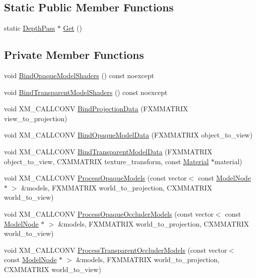 \subsection*{Static Public Member Functions}
\begin{DoxyCompactItemize}
\item 
static \hyperlink{classmage_1_1_depth_pass}{Depth\+Pass} $\ast$ \hyperlink{classmage_1_1_depth_pass_a62a4f1dd404fdb43517d372537ea0e7f}{Get} ()
\end{DoxyCompactItemize}
\subsection*{Private Member Functions}
\begin{DoxyCompactItemize}
\item 
void \hyperlink{classmage_1_1_depth_pass_a6e10b136e64265fa36b9152353946bdc}{Bind\+Opaque\+Model\+Shaders} () const noexcept
\item 
void \hyperlink{classmage_1_1_depth_pass_af7765d2e9d94627671341d5d782b16d2}{Bind\+Transparent\+Model\+Shaders} () const noexcept
\item 
void X\+M\+\_\+\+C\+A\+L\+L\+C\+O\+NV \hyperlink{classmage_1_1_depth_pass_a9fa93bf5d67b9396d358e595be55a075}{Bind\+Projection\+Data} (F\+X\+M\+M\+A\+T\+R\+IX view\+\_\+to\+\_\+projection)
\item 
void X\+M\+\_\+\+C\+A\+L\+L\+C\+O\+NV \hyperlink{classmage_1_1_depth_pass_a674fc5fe2e8cae4c704a554dc8bc1fdd}{Bind\+Opaque\+Model\+Data} (F\+X\+M\+M\+A\+T\+R\+IX object\+\_\+to\+\_\+view)
\item 
void X\+M\+\_\+\+C\+A\+L\+L\+C\+O\+NV \hyperlink{classmage_1_1_depth_pass_a37236eb83793b4f11f1f4f2ed86f60e2}{Bind\+Transparent\+Model\+Data} (F\+X\+M\+M\+A\+T\+R\+IX object\+\_\+to\+\_\+view, C\+X\+M\+M\+A\+T\+R\+IX texture\+\_\+transform, const \hyperlink{classmage_1_1_material}{Material} $\ast$material)
\item 
void X\+M\+\_\+\+C\+A\+L\+L\+C\+O\+NV \hyperlink{classmage_1_1_depth_pass_a2aabb8bd4676a8ce633e5cb91e6b13d9}{Process\+Opaque\+Models} (const vector$<$ const \hyperlink{classmage_1_1_model_node}{Model\+Node} $\ast$ $>$ \&models, F\+X\+M\+M\+A\+T\+R\+IX world\+\_\+to\+\_\+projection, C\+X\+M\+M\+A\+T\+R\+IX world\+\_\+to\+\_\+view)
\item 
void X\+M\+\_\+\+C\+A\+L\+L\+C\+O\+NV \hyperlink{classmage_1_1_depth_pass_acfbb86af8b6a106fe202a6999df9d744}{Process\+Opaque\+Occluder\+Models} (const vector$<$ const \hyperlink{classmage_1_1_model_node}{Model\+Node} $\ast$ $>$ \&models, F\+X\+M\+M\+A\+T\+R\+IX world\+\_\+to\+\_\+projection, C\+X\+M\+M\+A\+T\+R\+IX world\+\_\+to\+\_\+view)
\item 
void X\+M\+\_\+\+C\+A\+L\+L\+C\+O\+NV \hyperlink{classmage_1_1_depth_pass_a885b8d686f5f2e50ea8020073d551e82}{Process\+Transparent\+Occluder\+Models} (const vector$<$ const \hyperlink{classmage_1_1_model_node}{Model\+Node} $\ast$ $>$ \&models, F\+X\+M\+M\+A\+T\+R\+IX world\+\_\+to\+\_\+projection, C\+X\+M\+M\+A\+T\+R\+IX world\+\_\+to\+\_\+view)
\end{DoxyCompactItemize}
